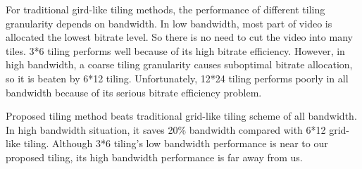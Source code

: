 For traditional gird-like tiling methods, the performance of different tiling granularity depends on bandwidth. In low bandwidth, most part of video is allocated the lowest bitrate level. So there is no need to cut the video into many tiles. 3*6 tiling performs well because of its high bitrate efficiency. However, in high bandwidth, a coarse tiling granularity causes suboptimal bitrate allocation, so it is beaten by 6*12 tiling. Unfortunately, 12*24 tiling performs poorly in all bandwidth because of its serious bitrate efficiency problem.

Proposed tiling method beats traditional grid-like tiling scheme of all bandwidth. In high bandwidth situation, it saves 20\% bandwidth compared with 6*12 grid-like tiling. Although 3*6 tiling's low bandwidth performance is near to our proposed tiling, its high bandwidth performance is far away from us.
